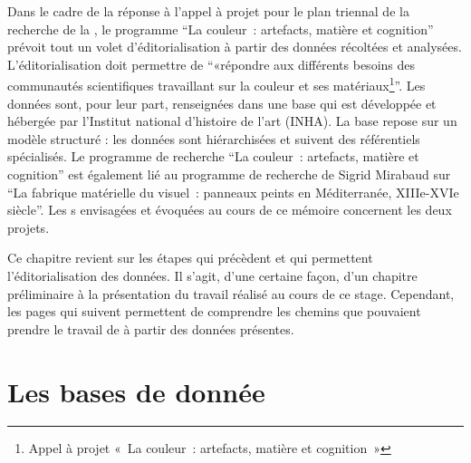 Dans le cadre de la réponse à l’appel à projet pour le plan triennal de la recherche de la , le programme \enquote{La couleur~: artefacts, matière et cognition} prévoit tout un volet d'éditorialisation à partir des données récoltées et analysées. L'éditorialisation doit permettre de \enquote{«répondre aux différents besoins des communautés scientifiques travaillant sur la couleur et ses matériaux\footnote{Appel à projet « La couleur~: artefacts, matière et cognition »}}. Les données sont, pour leur part, renseignées dans une base qui est développée et hébergée par l’Institut national d’histoire de l’art (INHA). La base repose sur un modèle structuré : les données sont hiérarchisées et suivent des référentiels spécialisés. Le programme de recherche \enquote{La couleur : artefacts, matière et cognition} est également lié au programme de recherche de Sigrid Mirabaud sur \enquote{La fabrique matérielle du visuel~: panneaux peints en Méditerranée, XIIIe-XVIe siècle}. Les s envisagées et évoquées au cours de ce mémoire concernent les deux projets. \par
Ce chapitre revient sur les étapes qui précèdent et qui permettent l’éditorialisation des données. Il s’agit, d’une certaine façon, d’un chapitre préliminaire à la présentation du travail réalisé au cours de ce stage. Cependant, les pages qui suivent permettent de comprendre les chemins que pouvaient prendre le travail de  à partir des données présentes. \newpage

\section{Les bases de donnée}

